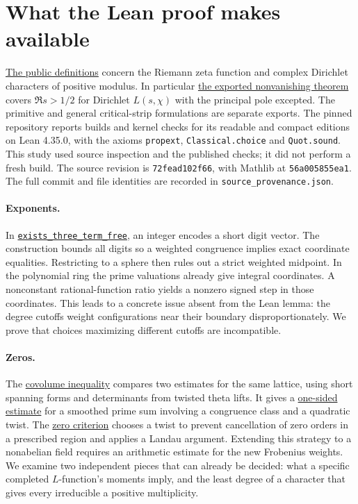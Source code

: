 \documentclass[11pt,letterpaper]{article}
\newcommand{\src}[2]{\href{https://github.com/lsernau/grh-lean/blob/72fead102f663d5c7a407964a13dc0cf9d977207/grh/#1}{#2}}
\begin{document}
\section{What the Lean proof makes available}
\noindent\src{src/Statements.lean}{The public definitions} concern the Riemann zeta function and complex Dirichlet characters of positive modulus. In particular \src{src/Main.lean}{the exported nonvanishing theorem} covers $\Re s>1/2$ for Dirichlet $L(s,\chi)$ with the principal pole excepted. The primitive and general critical-strip formulations are separate exports. The pinned repository reports builds and kernel checks for its readable and compact editions on Lean 4.35.0, with the axioms \texttt{propext}, \texttt{Classical.choice} and \texttt{Quot.sound}. This study used source inspection and the published checks; it did not perform a fresh build. The source revision is \texttt{72fead102f66}, with Mathlib at \texttt{56a005855ea1}. The full commit and file identities are recorded in \texttt{source\_provenance.json}.

\paragraph{Exponents.}
In \src{src/New/Reduction/Data/Existence.lean\#L80-L116}{\texttt{exists\_three\_term\_free}}, an integer encodes a short digit vector. The construction bounds all digits so a weighted congruence implies exact coordinate equalities. Restricting to a sphere then rules out a strict weighted midpoint. In the polynomial ring the prime valuations already give integral coordinates. A nonconstant rational-function ratio yields a nonzero signed step in those coordinates. This leads to a concrete issue absent from the Lean lemma: the degree cutoffs weight configurations near their boundary disproportionately. We prove that choices maximizing different cutoffs are incompatible.

\paragraph{Zeros.}
The \src{src/New/Reduction/MainInequality.lean}{covolume inequality} compares two estimates for the same lattice, using short spanning forms and determinants from twisted theta lifts. It gives a \src{src/New/Reduction/OneSidedBound.lean}{one-sided estimate} for a smoothed prime sum involving a congruence class and a quadratic twist. The \src{src/New/Reduction/Zeros/Criterion.lean}{zero criterion} chooses a twist to prevent cancellation of zero orders in a prescribed region and applies a Landau argument. Extending this strategy to a nonabelian field requires an arithmetic estimate for the new Frobenius weights. We examine two independent pieces that can already be decided: what a specific completed $L$-function's moments imply, and the least degree of a character that gives every irreducible a positive multiplicity.
\end{document}
